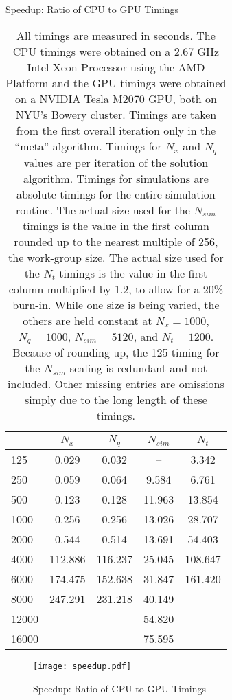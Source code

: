 \documentclass[a4paper,12pt]{article}
\numberwithin{equation}{section}
\theoremstyle{definition}
\begin{document}
\begin{table}[ht]
  \centering
  \caption{Speedup: Ratio of CPU to GPU Timings}
  \label{tab:speedup}
  \begin{tabular}{l c c c c}
    \toprule
    & $N_x$ & $N_q$ & $N_{sim}$ & $N_t$ \\
    \midrule
    125 & 0.029 & 0.032 &  -- & 3.342 \\
    250 & 0.059 & 0.064 & 9.584 & 6.761 \\
    500 & 0.123 & 0.128 & 11.963 & 13.854 \\
    1000 & 0.256 & 0.256 & 13.026 & 28.707 \\
    2000 & 0.544 & 0.514 & 13.691 & 54.403 \\
    4000 & 112.886 & 116.237 & 25.045 & 108.647 \\
    6000 & 174.475 & 152.638 & 31.847 & 161.420 \\
    8000 & 247.291 & 231.218 & 40.149 &  -- \\
    12000 &  -- &  -- & 54.820 &  -- \\
    16000 &  -- &  -- & 75.595 &  -- \\
    \bottomrule
  \end{tabular}
  \caption*{\footnotesize All timings are measured in seconds. The CPU timings were obtained on a 2.67 GHz Intel Xeon Processor using the AMD Platform and the GPU timings were obtained on a NVIDIA Tesla M2070 GPU, both on NYU's Bowery cluster. Timings are taken from the first overall iteration only in the ``meta'' algorithm. Timings for $N_x$ and $N_q$ values are per iteration of the solution algorithm. Timings for simulations are absolute timings for the entire simulation routine. The actual size used for the $N_{sim}$ timings is the value in the first column rounded up to the nearest multiple of 256, the work-group size. The actual size used for the $N_t$ timings is the value in the first column multiplied by 1.2, to allow for a 20\% burn-in. While one size is being varied, the others are held constant at $N_x = 1000$, $N_q = 1000$, $N_{sim} = 5120$, and $N_t = 1200$. Because of rounding up, the 125 timing for the $N_{sim}$ scaling is redundant and not included. Other missing entries are omissions simply due to the long length of these timings.}
\end{table}

\begin{figure}[ht]
  \centering
  \caption{Speedup: Ratio of CPU to GPU Timings}
  \label{fig:speedup}
  \texttt{[image: speedup.pdf]}
\end{figure}
\end{document}
